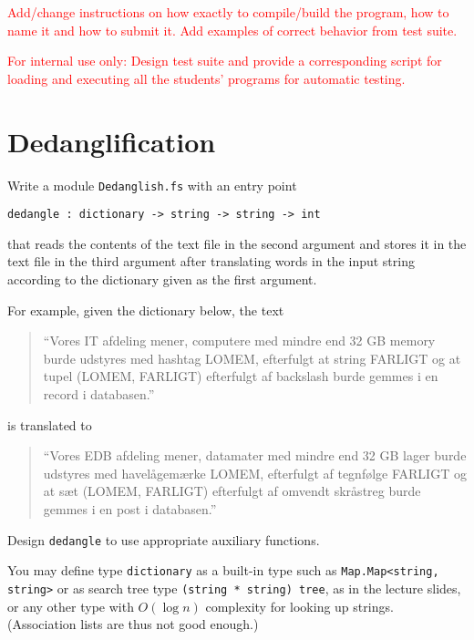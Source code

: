 \documentclass[a4paper,11pt]{article}
\newcommand{\comment}[1]{\textcolor{red}{#1}}
\begin{document}
\comment{Add/change instructions on how exactly to compile/build the program, how to name it and how to submit it.  Add examples of correct behavior from test suite.}

\comment{For internal use only: Design test suite and provide a corresponding script for loading and executing all the students' programs for automatic testing.}

\section{Dedanglification}

Write a module \verb|Dedanglish.fs| with an entry point
\begin{verbatim}
dedangle : dictionary -> string -> string -> int
\end{verbatim}
that reads the contents of the text file in the second argument and stores it in the text file in the third argument after translating words in the input string according to the dictionary given as the first argument.  

For example, given the dictionary below, the text 
\begin{quote}
``Vores IT afdeling mener, computere med mindre end 32 GB memory burde udstyres med hashtag LOMEM, efterfulgt at string FARLIGT og at tupel (LOMEM, FARLIGT) efterfulgt af backslash burde gemmes i en record i databasen.'' 
\end{quote}
is translated to 
\begin{quote}
``Vores EDB afdeling mener, datamater med mindre end 32 GB lager burde udstyres med havel\aa gem\ae rke LOMEM, efterfulgt af tegnf\o lge FARLIGT og at s\ae t (LOMEM, FARLIGT) efterfulgt af omvendt skr\aa streg burde gemmes i en post i databasen.''
\end{quote}

Design \verb|dedangle| to use appropriate auxiliary functions. 

You may define type \verb|dictionary| as a built-in type such as \verb|Map.Map<string, string>| or as search tree type \verb|(string * string) tree|, as in the lecture slides, or any other type with $O(\log n)$ complexity for looking up strings.  (Association lists are thus not good enough.)
\end{document}

